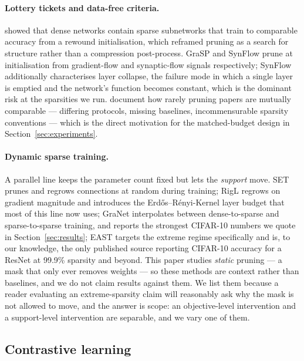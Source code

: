 \paragraph{Lottery tickets and data-free criteria.}
\citet{frankle2019lottery} showed that dense networks contain sparse subnetworks
that train to comparable accuracy from a rewound initialisation, which reframed
pruning as a search for structure rather than a compression post-process. GraSP
\citep{wang2020grasp} and SynFlow \citep{tanaka2020synflow} prune at
initialisation from gradient-flow and synaptic-flow signals respectively;
SynFlow additionally characterises layer collapse, the failure mode in which a
single layer is emptied and the network's function becomes constant, which is the
dominant risk at the sparsities we run. \citet{blalock2020state} document how
rarely pruning papers are mutually comparable --- differing protocols, missing
baselines, incommensurable sparsity conventions --- which is the direct motivation
for the matched-budget design in Section~\ref{sec:experiments}.

\paragraph{Dynamic sparse training.}
A parallel line keeps the parameter count fixed but lets the \emph{support} move.
SET \citep{mocanu2018set} prunes and regrows connections at random during
training; RigL \citep{evci2020rigl} regrows on gradient magnitude and introduces
the Erd\H{o}s--R\'{e}nyi-Kernel layer budget that most of this line now uses;
GraNet \citep{liu2021granet} interpolates between dense-to-sparse and
sparse-to-sparse training, and reports the strongest CIFAR-10 numbers we quote in
Section~\ref{sec:results}; EAST \citep{li2025east} targets the extreme regime
specifically and is, to our knowledge, the only published source reporting
CIFAR-10 accuracy for a ResNet at 99.9\% sparsity and beyond. This paper studies
\emph{static} pruning --- a mask that only ever removes weights --- so these
methods are context rather than baselines, and we do not claim results against
them. We list them because a reader evaluating an extreme-sparsity claim will
reasonably ask why the mask is not allowed to move, and the answer is scope: an
objective-level intervention and a support-level intervention are separable, and
we vary one of them.

\subsection{Contrastive learning}

